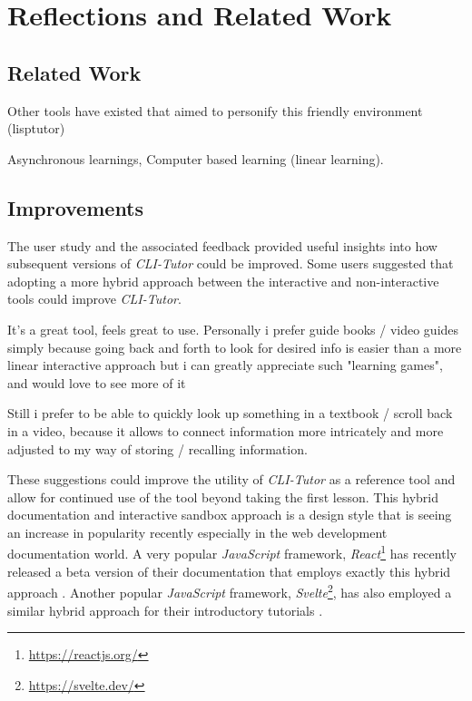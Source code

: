 \chapter{Reflections and Related Work}
\label{chap:reflection}
\section{Related Work}

Other tools have existed that aimed to personify this friendly environment (lisptutor)

Asynchronous learnings, Computer based learning (linear learning). \cite{becker201950, ossovski2022comparing}

\section{Improvements}

The user study and the associated feedback provided useful insights into how subsequent versions of \textit{CLI-Tutor} could be improved. Some users suggested that adopting a more hybrid approach between the interactive and non-interactive tools could improve \textit{CLI-Tutor}.

\begin{quotes}
	It's a great tool, feels great to use. Personally i prefer guide books / video guides simply
	because going back and forth to look for desired info is easier than a more linear interactive
	approach but i can greatly appreciate such "learning games", and would love to see more of it
\end{quotes}

\begin{quotes}
	Still i prefer to be able to quickly look up something in a textbook / scroll back in a video,
	because it allows to connect information more intricately and more adjusted to my way of
	storing / recalling information.
\end{quotes}

These suggestions could improve the utility of \textit{CLI-Tutor} as a
reference tool and allow for continued use of the tool beyond taking the first
lesson. This hybrid documentation and interactive sandbox approach is a design
style that is seeing an increase in popularity recently especially in the web
development documentation world. A very popular  \textit{JavaScript} framework,
\textit{React}\footnote{\url{https://reactjs.org/}} has recently released a
beta version of their documentation that employs exactly this hybrid approach
\cite{team_meta}. Another popular \textit{JavaScript} framework,
\textit{Svelte}\footnote{\url{https://svelte.dev/}}, has also employed a similar
hybrid approach for their introductory tutorials \cite{harris_team}.



